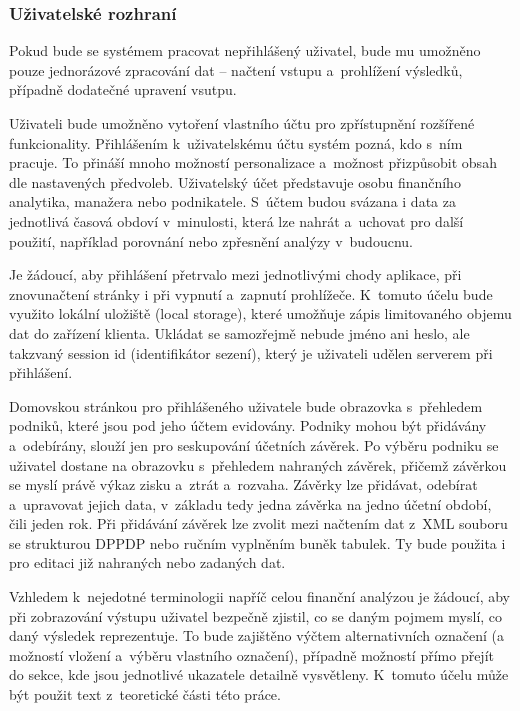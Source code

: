 \subsubsection{Uživatelské rozhraní}

Pokud bude se systémem pracovat nepřihlášený uživatel, bude mu umožněno pouze jednorázové zpracování dat -- načtení vstupu a~prohlížení výsledků, případně dodatečné upravení vsutpu.

Uživateli bude umožněno vytoření vlastního účtu pro zpřístupnění rozšířené funkcionality. Přihlášením k~uživatelskému účtu systém pozná, kdo s~ním pracuje. To přináší mnoho možností personalizace a~možnost přizpůsobit obsah dle nastavených předvoleb. Uživatelský účet představuje osobu finančního analytika, manažera nebo podnikatele. S~účtem budou svázana i data za jednotlivá časová obdoví v~minulosti, která lze nahrát a~uchovat pro další použití, například porovnání nebo zpřesnění analýzy v~budoucnu.

Je žádoucí, aby přihlášení přetrvalo mezi jednotlivými chody aplikace, při znovunačtení stránky i při vypnutí a~zapnutí prohlížeče. K~tomuto účelu bude využito lokální uložiště (local storage), které umožňuje zápis limitovaného objemu dat do zařízení klienta. Ukládat se samozřejmě nebude jméno ani heslo, ale takzvaný session id (identifikátor sezení), který je uživateli udělen serverem při přihlášení.

Domovskou stránkou pro přihlášeného uživatele bude obrazovka s~přehledem podniků, které jsou pod jeho účtem evidovány. Podniky mohou být přidávány a~odebírány, slouží jen pro seskupování účetních závěrek.
Po výběru podniku se uživatel dostane na obrazovku s~přehledem nahraných závěrek, přičemž závěrkou se myslí právě výkaz zisku a~ztrát a~rozvaha. Závěrky lze přidávat, odebírat a~upravovat jejich data, v~základu tedy jedna závěrka na jedno účetní období, čili jeden rok. Při přidávání závěrek lze zvolit mezi načtením dat z~XML souboru se strukturou DPPDP nebo ručním vyplněním buněk tabulek. Ty bude použita i pro editaci již nahraných nebo zadaných dat.  

Vzhledem k~nejedotné terminologii napříč celou finanční analýzou je žádoucí, aby při zobrazování výstupu uživatel bezpečně zjistil, co se daným pojmem myslí, co daný výsledek reprezentuje. To bude zajištěno výčtem alternativních označení (a možností vložení a~výběru vlastního označení), případně možností přímo přejít do sekce, kde jsou jednotlivé ukazatele detailně vysvětleny. K~tomuto účelu může být použit text z~teoretické části této práce.

